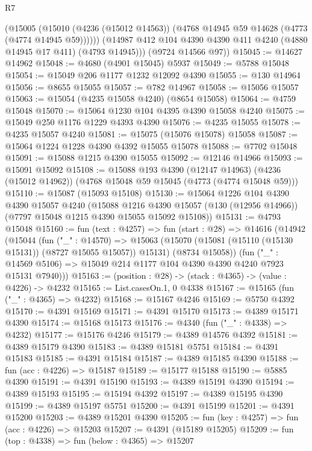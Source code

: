 \begin{lexlean}{R7}
\begin{coremodule}
          (@15005
            (@15010 (@4236 (@15012 @14563)) (@4768 @14945 @59 @14628 (@4773 (@4774 @14945 @59))))))
        (@14987 @412 @104 @4390 @4390 @411 @4240 (@4880 @14945 @17 @411) (@4793 @14945)))
      (@9724 @14566 @97))
@15045 := @14627 @14962
@15048 := @4680 (@4901 @15045) @5937
@15049 := @5788 @15048
@15054 := @15049 @206 @1177 @1232 @12092 @4390
@15055 := @130 @14964
@15056 := @8655 @15055
@15057 := @782 @14967
@15058 := @15056 @15057
@15063 := @15054 (@4235 @15058 @4240) (@8654 @15058)
@15064 := @4759 @15048
@15070 := @15064 @1230 @104 @4395 @4390 @15058 @4240
@15075 := @15049 @250 @1176 @1229 @4393 @4390
@15076 := @4235 @15055
@15078 := @4235 @15057 @4240
@15081 := @15075 (@15076 @15078) @15058
@15087 := @15064 @1224 @1228 @4390 @4392 @15055 @15078
@15088 := @7702 @15048
@15091 := @15088 @1215 @4390 @15055
@15092 := @12146 @14966
@15093 := @15091 @15092
@15108 := @15088
    @193
    @4390
    (@12147 @14963)
    (@4236 (@15012 @14962))
    (@4768 @15048 @59 @15045 (@4773 (@4774 @15048 @59)))
@15110 := @15087 (@15093 @15108)
@15130 := @15064
    @1226
    @104
    @4390
    @4390
    @15057
    @4240
    (@15088
      @1216
      @4390
      @15057
      (@130 (@12956 @14966))
      (@7797 @15048 @1215 @4390 @15055 @15092 @15108))
@15131 := @4793 @15048
@15160 := fun (text : @4257) =>
  fun (start : @28) =>
  @14616
    (@14942
      (@15044
        (fun ("_" : @14570) =>
        @15063
          (@15070 (@15081 (@15110 (@15130 @15131)) (@8727 @15055 @15057)) @15131)
          (@8734 @15058))
        (fun ("_" : @14569 @5106) => @15049 @214 @1177 @104 @4390 @4390 @4240 @7923 @15131 @7940)))
@15163 := (position : @28) -> (stack : @4365) -> (value : @4226) -> @4232
@15165 := List.casesOn.{1, 0} @4338
@15167 := @15165 (fun ("_" : @4365) => @4232)
@15168 := @15167 @4246
@15169 := @5750 @4392
@15170 := @4391 @15169
@15171 := @4391 @15170
@15173 := @4389 @15171 @4390
@15174 := @15168 @15173
@15176 := @4340 (fun ("_" : @4338) => @4232)
@15177 := @15176 @4246
@15179 := @4389 @14576 @4392
@15181 := @4389 @15179 @4390
@15183 := @4389 @15181 @5751
@15184 := @4391 @15183
@15185 := @4391 @15184
@15187 := @4389 @15185 @4390
@15188 := fun (acc : @4226) => @15187
@15189 := @15177 @15188
@15190 := @5885 @4390
@15191 := @4391 @15190
@15193 := @4389 @15191 @4390
@15194 := @4389 @15193
@15195 := @15194 @4392
@15197 := @4389 @15195 @4390
@15199 := @4389 @15197 @5751
@15200 := @4391 @15199
@15201 := @4391 @15200
@15203 := @4389 @15201 @4390
@15205 := fun (key : @4257) => fun (acc : @4226) => @15203
@15207 := @4391 (@15189 @15205)
@15209 := fun (top : @4338) => fun (below : @4365) => @15207

\end{coremodule}
\end{lexlean}
